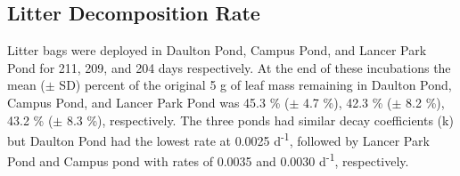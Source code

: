 \subsection{Litter Decomposition Rate}

Litter bags were deployed in Daulton Pond, Campus Pond, and Lancer Park Pond for 211, 209, and 204 days respectively. At the end of these incubations  the mean ($\pm$ SD) percent of  the original 5 g of leaf mass remaining in Daulton Pond, Campus Pond, and Lancer Park Pond was 45.3 \% ($\pm$ 4.7 \%), 42.3 \% ($\pm$ 8.2 \%), 43.2 \% ($\pm$ 8.3 \%), respectively. The three ponds had similar decay coefficients (k) but Daulton Pond had the lowest rate at 0.0025 d\textsuperscript{-1}, followed by Lancer Park Pond and Campus pond with rates of 0.0035 and 0.0030 d\textsuperscript{-1}, respectively.  




  
  